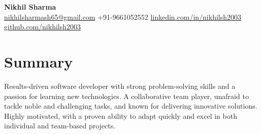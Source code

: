 \documentclass[a4paper,10pt]{article} %
\begin{document}
\begin{center}
    {\Huge \textbf{Nikhil Sharma}} \\
    \vspace{6pt} %
    \small
    \faEnvelope \href{mailto:nikhilsharmash65@gmail.com}{nikhilsharmash65@gmail.com} \hspace{1.5em} %
    \faMobile \hspace{0.3em} +91-9661052552 \hspace{1.5em} %
    \faLinkedinSquare \href{https://www.linkedin.com/in/nikhilsh2003/}{linkedin.com/in/nikhilsh2003} \hspace{1.5em} %
    \faGithub \href{https://github.com/nikhilsh2003}{github.com/nikhilsh2003} %
\end{center}

\vspace{0.7em} %

\section*{Summary}
Results-driven software developer with strong problem-solving skills and a passion for learning new technologies. A collaborative team player, unafraid to tackle noble and challenging tasks, and known for delivering innovative solutions. Highly motivated, with a proven ability to adapt quickly and excel in both individual and team-based projects.

\vspace{0.7em} %

\end{document}
